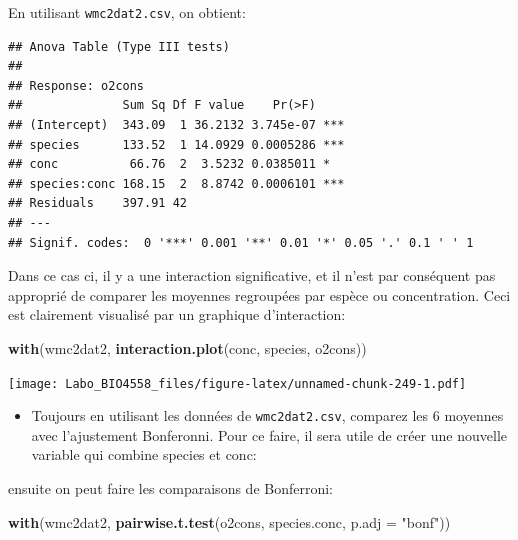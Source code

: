 \documentclass[
  12pt,
]{book}
\newenvironment{Shaded}{\begin{snugshade}}{\end{snugshade}}
\newcommand{\DataTypeTok}[1]{\textcolor[rgb]{0.13,0.29,0.53}{#1}}
\newcommand{\KeywordTok}[1]{\textcolor[rgb]{0.13,0.29,0.53}{\textbf{#1}}}
\newcommand{\NormalTok}[1]{#1}
\newcommand{\OperatorTok}[1]{\textcolor[rgb]{0.81,0.36,0.00}{\textbf{#1}}}
\newcommand{\StringTok}[1]{\textcolor[rgb]{0.31,0.60,0.02}{#1}}
\providecommand{\tightlist}{%
  \setlength{\itemsep}{0pt}\setlength{\parskip}{0pt}}
\begin{document}
En utilisant \texttt{wmc2dat2.csv}, on obtient:

\begin{verbatim}
## Anova Table (Type III tests)
## 
## Response: o2cons
##              Sum Sq Df F value    Pr(>F)    
## (Intercept)  343.09  1 36.2132 3.745e-07 ***
## species      133.52  1 14.0929 0.0005286 ***
## conc          66.76  2  3.5232 0.0385011 *  
## species:conc 168.15  2  8.8742 0.0006101 ***
## Residuals    397.91 42                      
## ---
## Signif. codes:  0 '***' 0.001 '**' 0.01 '*' 0.05 '.' 0.1 ' ' 1
\end{verbatim}

Dans ce cas ci, il y a une interaction significative, et il n'est par conséquent pas approprié de comparer les moyennes regroupées par espèce ou concentration. Ceci est clairement visualisé par un graphique d'interaction:

\begin{Shaded}
\begin{Highlighting}[]
\KeywordTok{with}\NormalTok{(wmc2dat2, }\KeywordTok{interaction.plot}\NormalTok{(conc, species, o2cons))}
\end{Highlighting}
\end{Shaded}

\texttt{[image: Labo\_BIO4558\_files/figure-latex/unnamed-chunk-249-1.pdf]}

\begin{itemize}
\tightlist
\item
  Toujours en utilisant les données de \texttt{wmc2dat2.csv}, comparez les 6 moyennes avec l'ajustement Bonferonni. Pour ce faire, il sera utile de créer une nouvelle variable qui combine species et conc:
\end{itemize}

\begin{Shaded}
\end{Shaded}

ensuite on peut faire les comparaisons de Bonferroni:

\begin{Shaded}
\begin{Highlighting}[]
\KeywordTok{with}\NormalTok{(wmc2dat2, }\KeywordTok{pairwise.t.test}\NormalTok{(o2cons, species.conc, }\DataTypeTok{p.adj =} \StringTok{"bonf"}\NormalTok{))}
\end{Highlighting}
\end{Shaded}
\end{document}
